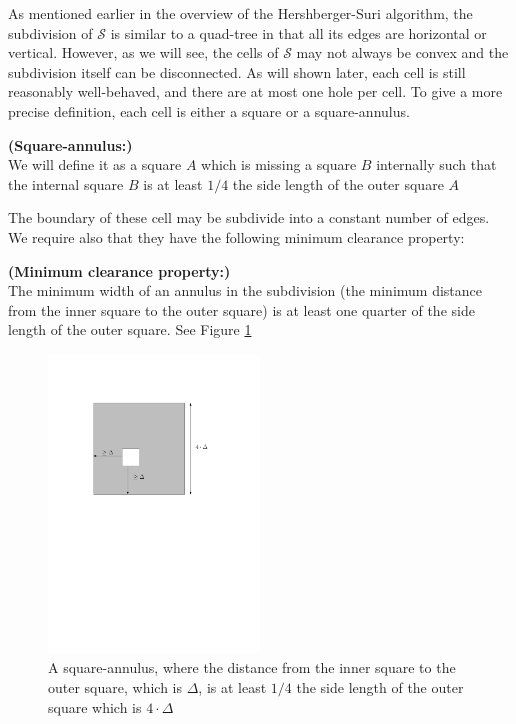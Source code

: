As mentioned earlier in the overview of the Hershberger-Suri algorithm, the subdivision of 
$\mathcal{S}$ is similar to a quad-tree in that all its edges are horizontal or vertical. 
However, as we will see, the cells of $\mathcal{S}$ may not always be convex and the 
subdivision itself can be disconnected. As will shown later, each cell is still reasonably 
well-behaved, and there are at most one hole per cell. To give a more precise definition, 
each cell is either a square or a square-annulus.

\begin{mydef}
	\textbf{(Square-annulus:)}\\
	We will define it as a square $A$ which is missing  a square $B$ internally such that 
    the internal square $B$ is at least $1/4$ the side length of the outer square $A$
\end{mydef}

The boundary of these cell may be subdivide into a constant number of edges.
We require also that they have the following minimum clearance property: 

\begin{mydef}
\textbf{(Minimum clearance property:)} \label{minimumclearanceproperty}\\
      The minimum width of an annulus in the subdivision (the minimum distance from the 
      inner square to the outer square) is at least one quarter of the side length of the 
      outer square. See Figure \ref{fig:minimumclearancesquareannulus}
\end{mydef}

\begin{figure}[H]
	\centering
	\includegraphics[width=0.5\textwidth]{figures/minimumclearance.pdf}
	\caption{A square-annulus, where the distance from the inner square to the outer 
  			 square, which is $\Delta$, is at least $1/4$ the side length of the outer 
             square which is $4\cdot \Delta$}
	\label{fig:minimumclearancesquareannulus}
\end{figure}

